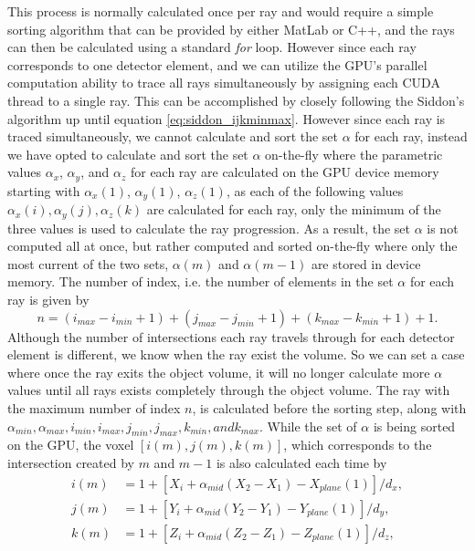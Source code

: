 This process is normally calculated once per ray and would require a simple sorting algorithm that can be provided by either MatLab or C++, and the rays can then be calculated using a standard \textit{for} loop.  However since each ray corresponds to one detector element, and we can utilize the GPU's parallel computation ability to trace all rays simultaneously by assigning each CUDA thread to a single ray.  This can be accomplished by closely following the Siddon's algorithm up until equation \ref{eq:siddon_ijkminmax}.  However since each ray is traced simultaneously, we cannot calculate and sort the set ${\alpha}$ for each ray, instead we have opted to calculate and sort the set ${\alpha}$ on-the-fly where the parametric values ${\alpha_x}$, ${\alpha_y}$, and ${\alpha_z}$ for each ray are calculated on the GPU device memory starting with $\alpha_x(1)$, $\alpha_y(1)$, $\alpha_z(1)$, as  each of the following values ${\alpha_x(i), \alpha_y(j), \alpha_z(k)}$ are calculated for each ray, only the minimum of the three values is used to calculate the ray progression.  As a result, the set ${\alpha}$ is not computed all at once, but rather computed and sorted on-the-fly where only the most current of the two sets, $\alpha(m)$ and 
$\alpha(m-1)$ are stored in device memory.  The number of index, i.e. the number of elements in the set ${\alpha}$ for each ray is given by 
\begin{equation}
n = (i_{max} - i_{min} + 1) + (j_{max} - j_{min}+1) + (k_{max}-k_{min}+1) + 1.
\label{eq:siddon_n}
\end{equation}
Although the number of intersections each ray travels through for each detector element is different, we know when the ray exist the volume.  So we can set a case where once the ray exits the object volume, it will no longer calculate more $\alpha$ values until all rays exists completely through the object volume.  The ray with the maximum number of index $n$, is calculated before the sorting step, along with $\alpha_{min}, \alpha_{max}, i_{min}, i_{max}, j_{min}, j_{max}, k_{min}, and k_{max}$.  While the set of ${\alpha}$ is being sorted on the GPU, the voxel $\left[ i(m), j(m), k(m) \right]$, which corresponds to the intersection created by $m$ and $m-1$ is also calculated each time by
\begin{equation}
\begin{aligned}
i(m) &= 1 + \left[ X_i + \alpha_{mid}(X_2 - X_1) - X_{plane}(1) \right] /d_x, \\
j(m) &= 1 + \left[ Y_i + \alpha_{mid}(Y_2 - Y_1) - Y_{plane}(1) \right] /d_y, \\
k(m) &= 1 + \left[ Z_i + \alpha_{mid}(Z_2 - Z_1) - Z_{plane}(1) \right] /d_z,
\end{aligned}
\label{eq:siddon_voxel}
\end{equation}
